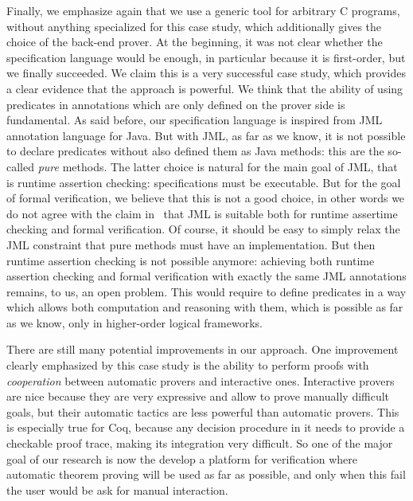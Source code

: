 Finally, we emphasize again that we use a generic tool for arbitrary C
programs, without anything specialized for this case study, which
additionally gives the choice of the back-end prover. At the
beginning, it was not clear whether the \caduceus{} specification
language would be enough, in particular because it is first-order, but
we finally succeeded.  We claim this is a very successful case study,
which provides a clear evidence that the \caduceus{} approach is
powerful. We think that the ability of using predicates in annotations
which are only defined on the prover side is fundamental. As said
before, our specification language is inspired from JML annotation
language for Java. But with JML, as far as we know, it is not possible
to declare predicates without also defined them as Java methods: this
are the so-called \emph{pure} methods. The latter choice is natural
for the main goal of JML, that is runtime assertion checking:
specifications must be executable. But for the goal of formal
verification, we believe that this is not a good choice, in other
words we do not agree with the claim in~\cite{leavens03a} that JML is
suitable both for runtime assertime checking and formal verification.
Of course, it should be easy to simply relax the JML constraint that
pure methods must have an implementation. But then runtime assertion
checking is not possible anymore: achieving both runtime assertion
checking and formal verification with exactly the same JML annotations
remains, to us, an open problem. This would require to define
predicates in a way which allows both computation and reasoning with
them, which is possible as far as we know, only in higher-order
logical frameworks.

There are still many potential improvements in our approach. One
improvement clearly emphasized by this case study is the ability to
perform proofs with \emph{cooperation} between automatic provers and
interactive ones. Interactive provers are nice because they are very
expressive and allow to prove manually difficult goals, but their
automatic tactics are less powerful than automatic provers. This is
especially true for Coq, because any decision procedure in it needs to
provide a checkable proof trace, making its integration very
difficult. So one of the major goal of our research is now the develop
a platform for verification where automatic theorem proving will be
used as far as possible, and only when this fail the user would be ask
for manual interaction.


